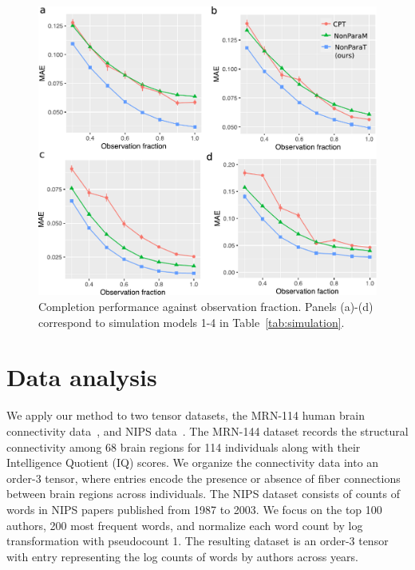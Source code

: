\documentclass{article}
\theoremstyle{plain}
\theoremstyle{definition}
\begin{document}
\begin{figure}[h!]
\vspace{-.2cm}
\includegraphics[width=.45\textwidth]{figure/fig5-8.pdf}
\vspace{-.2cm}
\caption{Completion performance against observation fraction. Panels (a)-(d) correspond to simulation models 1-4 in Table~\ref{tab:simulation}. }\label{fig:compare2}
\vspace{-.4cm}
\end{figure}

\section{Data analysis}
We apply our method to two tensor datasets, the MRN-114 human brain connectivity data~\citep{wang2017bayesian}, and NIPS data~\cite{globerson2007euclidean}. The MRN-144 dataset records the structural connectivity among 68 brain regions for 114 individuals along with their Intelligence Quotient (IQ) scores. We organize the connectivity data into an order-3 tensor, where entries encode the presence or absence of fiber connections between brain regions across individuals. The NIPS dataset consists of counts of words in NIPS papers published from 1987 to 2003. We focus on the top 100 authors, 200 most frequent words, and normalize each word count by log transformation with pseudocount 1. The resulting dataset is an order-3 tensor with entry representing the log counts of words by authors across years. 
\end{document}

